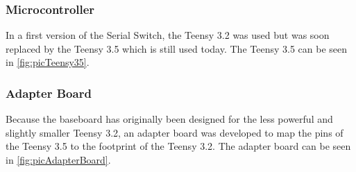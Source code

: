 \subsubsection{Microcontroller}
%
In a first version of the Serial Switch, the Teensy 3.2 was used but was soon replaced by the Teensy 3.5 which is still used today. The Teensy 3.5 can be seen in \autoref{fig:picTeensy35}.
%
\subsubsection{Adapter Board}
Because the baseboard has originally been designed for the less powerful and slightly smaller Teensy 3.2, an adapter board was developed to map the pins of the Teensy 3.5 to the footprint of the Teensy 3.2. The adapter board can be seen in \autoref{fig:picAdapterBoard}.
%
%

